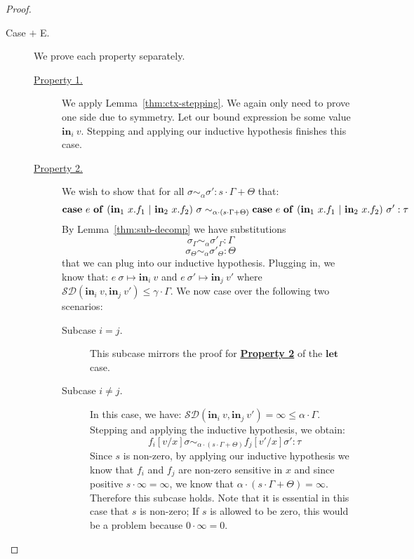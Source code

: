 \begin{proof}
\begin{description}
    \item[Case $+$ E.] 
      We prove each property separately.
      \begin{description}
        \item[\underline{Property 1.}]
          We apply Lemma~\ref{thm:ctx-stepping}. We again only need to prove one
          side due to symmetry. Let our bound expression be some value
          $\textbf{in}_i ~ v$. Stepping and applying our inductive hypothesis
          finishes this case.
        \item[\underline{Property 2.}]
          We wish to show that for all 
          $\sigma \sim_{\alpha} \sigma': s \cdot \Gamma + \Theta$ 
          that:
          $$
          \mathbf{case} \ e \ \mathbf{of} \ (\tin_1 \ x.f_1 \ | \ \tin_2 \ x.f_2)~\sigma
          \sim_{\alpha \cdot (s \cdot \Gamma + \Theta)}
          \mathbf{case} \ e \ \mathbf{of} \ (\tin_1 \ x.f_1 \ | \ \tin_2 \ x.f_2)~\sigma'
          : \tau
          $$
          By Lemma~\ref{thm:sub-decomp} we have substitutions
          $$
          \sigma_{\Gamma} \sim_{\alpha} \sigma'_{\Gamma} : \Gamma
          $$
          $$
          \sigma_{\Theta} \sim_{\alpha} \sigma'_{\Theta} : \Theta
          $$
          that we can plug into our inductive hypothesis. Plugging in, we
          know that: $e~\sigma \mapsto \mathbf{in}_i~v$ 
          and $e~\sigma' \mapsto \mathbf{in}_j~v'$ where
          $\mathcal{SD}(\mathbf{in}_i~v, \mathbf{in}_j~v') 
          \leq \gamma \cdot \Gamma$.
          We now case over the following two scenarios:
          \begin{description}
            \item[Subcase $i = j$.] This subcase mirrors the proof for
              \textbf{\underline{Property 2}} of the $\textbf{let}$ case.
            \item[Subcase $i \not= j$.] In this case, we have:
              $\mathcal{SD}(\mathbf{in}_i~v, \mathbf{in}_j~v') = \infty \leq
              \alpha \cdot \Gamma$. Stepping and applying the inductive
              hypothesis, we obtain:
              $$
              f_i [v/x]\sigma 
              \sim_{\alpha \cdot (s \cdot \Gamma + \Theta)}
              f_j [v'/x]\sigma'
              : \tau
              $$
              Since $s$ is non-zero, by applying our inductive hypothesis we
              know that $f_i$ and $f_j$ are non-zero sensitive in $x$ and since
              positive $s \cdot \infty = \infty$, we know that $\alpha \cdot (s
              \cdot \Gamma + \Theta) = \infty$. Therefore this subcase holds.
              Note that it is essential in this case that $s$ is non-zero; If
              $s$ is allowed to be zero, this would be a problem because $0
              \cdot \infty = 0$.
          \end{description}


      \end{description}

  \end{description}
\end{proof}

%
